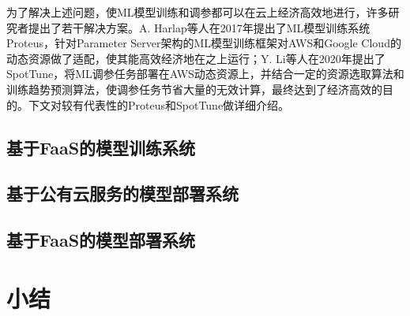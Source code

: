 为了解决上述问题，使ML模型训练和调参都可以在云上经济高效地进行，许多研究者提出了若干解决方案。A. Harlap等人在2017年提出了ML模型训练系统Proteus\parencite{harlap2017proteus}，针对Parameter Server架构的ML模型训练框架对AWS和Google Cloud的动态资源做了适配，使其能高效经济地在之上运行；Y. Li等人在2020年提出了SpotTune\parencite{li2020spottune}，将ML调参任务部署在AWS动态资源上，并结合一定的资源选取算法和训练趋势预测算法，使调参任务节省大量的无效计算，最终达到了经济高效的目的。下文对较有代表性的Proteus和SpotTune做详细介绍。

\subsection{基于FaaS的模型训练系统}

\subsection{基于公有云服务的模型部署系统}

\subsection{基于FaaS的模型部署系统}

\section{小结}
